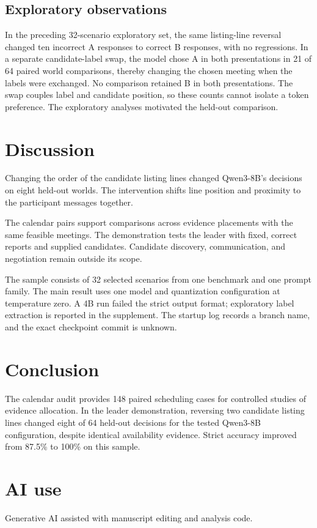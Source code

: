 \documentclass[letterpaper]{article}
\begin{document}
\subsection{Exploratory observations}

In the preceding 32-scenario exploratory set, the same listing-line reversal changed ten incorrect A responses to correct B responses, with no regressions. In a separate candidate-label swap, the model chose A in both presentations in 21 of 64 paired world comparisons, thereby changing the chosen meeting when the labels were exchanged. No comparison retained B in both presentations. The swap couples label and candidate position, so these counts cannot isolate a token preference. The exploratory analyses motivated the held-out comparison.

\section{Discussion}

Changing the order of the candidate listing lines changed Qwen3-8B's decisions on eight held-out worlds. The intervention shifts line position and proximity to the participant messages together.

The calendar pairs support comparisons across evidence placements with the same feasible meetings. The demonstration tests the leader with fixed, correct reports and supplied candidates. Candidate discovery, communication, and negotiation remain outside its scope.

The sample consists of 32 selected scenarios from one benchmark and one prompt family. The main result uses one model and quantization configuration at temperature zero. A 4B run failed the strict output format; exploratory label extraction is reported in the supplement. The startup log records a branch name, and the exact checkpoint commit is unknown.

\section{Conclusion}

The calendar audit provides 148 paired scheduling cases for controlled studies of evidence allocation. In the leader demonstration, reversing two candidate listing lines changed eight of 64 held-out decisions for the tested Qwen3-8B configuration, despite identical availability evidence. Strict accuracy improved from 87.5\% to 100\% on this sample.

\section{AI use}
Generative AI assisted with manuscript editing and analysis code.


\end{document}
